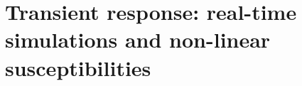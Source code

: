 \section{Transient response: real-time simulations and non-linear susceptibilities}
\label{sec:theory}

